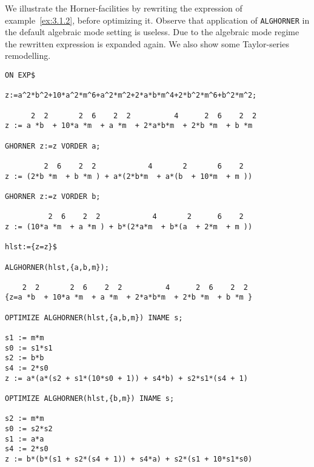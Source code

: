 We illustrate the Horner-facilities by rewriting the expression of
example~\ref{ex:3.1.2}, before optimizing it. Observe that
application of {\tt ALGHORNER} in the default algebraic mode setting
is useless. Due to  the algebraic mode regime the rewritten expression
is expanded again. We also show some Taylor-series remodelling.
{\small
\begin{verbatim}
ON EXP$

z:=a^2*b^2+10*a^2*m^6+a^2*m^2+2*a*b*m^4+2*b^2*m^6+b^2*m^2;

      2  2       2  6    2  2          4      2  6    2  2
z := a *b  + 10*a *m  + a *m  + 2*a*b*m  + 2*b *m  + b *m

GHORNER z:=z VORDER a;

         2  6    2  2            4       2       6    2
z := (2*b *m  + b *m ) + a*(2*b*m  + a*(b  + 10*m  + m ))

GHORNER z:=z VORDER b;

          2  6    2  2            4       2      6    2
z := (10*a *m  + a *m ) + b*(2*a*m  + b*(a  + 2*m  + m ))

hlst:={z=z}$

ALGHORNER(hlst,{a,b,m});

    2  2       2  6    2  2          4      2  6    2  2
{z=a *b  + 10*a *m  + a *m  + 2*a*b*m  + 2*b *m  + b *m }

OPTIMIZE ALGHORNER(hlst,{a,b,m}) INAME s;

s1 := m*m
s0 := s1*s1
s2 := b*b
s4 := 2*s0
z := a*(a*(s2 + s1*(10*s0 + 1)) + s4*b) + s2*s1*(s4 + 1)

OPTIMIZE ALGHORNER(hlst,{b,m}) INAME s;

s2 := m*m
s0 := s2*s2
s1 := a*a
s4 := 2*s0
z := b*(b*(s1 + s2*(s4 + 1)) + s4*a) + s2*(s1 + 10*s1*s0)
\end{verbatim}}
\newpage
